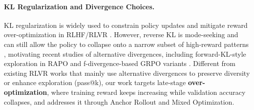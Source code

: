 \paragraph{KL Regularization and Divergence Choices.}
KL regularization is widely used to constrain policy updates and mitigate reward over-optimization in RLHF/RLVR \citep{ouyang2022training, gao2023scaling, klcomedy}. 
However, reverse KL is mode-seeking and can still allow the policy to collapse onto a narrow subset of high-reward patterns \citep{beyondkl, klcollapse}, motivating recent studies of alternative divergences, including forward-KL-style exploration in RAPO \citep{deng2025unlocking} and f-divergence-based GRPO variants \citep{li2025choice}. 
Different from existing RLVR works that mainly use alternative divergences to preserve diversity or enhance exploration (pass@k), our work targets late-stage \textbf{over-optimization}, where training reward keeps increasing while validation accuracy collapses, and addresses it through Anchor Rollout and Mixed Optimization.
